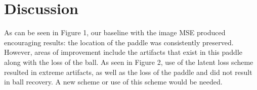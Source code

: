 \section{Discussion}
As can be seen in Figure 1, our baseline with the image MSE produced encouraging results: the location of the paddle was consistently preserved. However, areas of improvement include the artifacts that exist in this paddle along with the loss of the ball. As seen in Figure 2, use of the latent loss scheme resulted in extreme artifacts, as well as the loss of the paddle and did not result in ball recovery. A new scheme or use of this scheme would be needed.